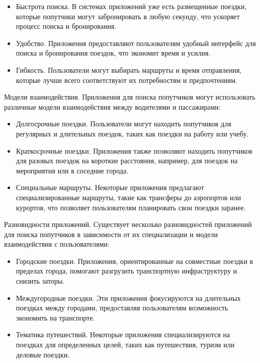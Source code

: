 \begin{itemize}
	\item Быстрота поиска. В системах приложений уже есть размещенные поездки, которые попутчики могут забронировать в любую секунду, что ускоряет процесс поиска и бронирования.
	
	\item Удобство. Приложения предоставляют пользователям удобный интерфейс для поиска и бронирования поездок, что экономит время и усилия.
	
	\item Гибкость. Пользователи могут выбирать маршруты и время отправления, которые лучше всего соответствуют их потребностям и предпочтениям.
\end{itemize}

Модели взаимодействия.
Приложения для поиска попутчиков могут использовать различные модели взаимодействия между водителями и пассажирами:

\begin{itemize}
	\item Долгосрочные поездки. Пользователи могут находить попутчиков для регулярных и длительных поездок, таких как поездки на работу или учебу.
	
	\item Краткосрочные поездки. Приложения также позволяют находить попутчиков для разовых поездок на короткие расстояния, например, для поездок на мероприятия или в соседние города.
	
	\item Специальные маршруты. Некоторые приложения предлагают специализированные маршруты, такие как трансферы до аэропортов или курортов, что позволяет пользователям планировать свои поездки заранее.
\end{itemize}

Разновидности приложений.
Существует несколько разновидностей приложений для поиска попутчиков в зависимости от их специализации и модели взаимодействия с пользователями:

\begin{itemize}
	\item Городские поездки. Приложения, ориентированные на совместные поездки в пределах города, помогают разгрузить транспортную инфраструктуру и снизить заторы.
	
	\item Междугородные поездки. Эти приложения фокусируются на длительных поездках между городами, предоставляя пользователям возможность экономить на транспорте.
	
	\item Тематика путешествий. Некоторые приложения специализируются на поездках для определенных целей, таких как путешествия, туризм или деловые поездки.
\end{itemize}

